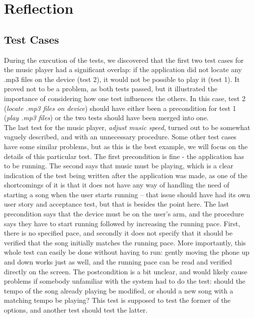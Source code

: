 \section{Reflection}
\subsection{Test Cases}
During the execution of the tests, we discovered that the first two test cases for the music player had a significant overlap: if the application did not locate any .mp3 files on the device (test 2), it would not be possible to play it (test 1).
It proved not to be a problem, as both tests passed, but it illustrated the importance of considering how one test influences the others.
In this case, test 2 (\textit{locate .mp3 files on device}) should have either been a precondition for test 1 (\textit{play .mp3 files}) or the two tests should have been merged into one.\\

The last test for the music player, \textit{adjust music speed}, turned out to be somewhat vaguely described, and with an unnecessary procedure.
Some other test cases have some similar problems, but as this is the best example, we will focus on the details of this particular test.
The first precondition is fine - the application has to be running.
The second says that music must be playing, which is a clear indication of the test being written after the application was made, as one of the shortcomings of it is that it does not have any way of handling the need of starting a song when the user starts running -- that issue should have had its own user story and acceptance test, but that is besides the point here.
The last precondition says that the device must be on the user's arm, and the procedure says they have to start running followed by increasing the running pace.
First, there is no specified pace, and secondly it does not specify that it should be verified that the song initially matches the running pace.
More importantly, this whole test can easily be done without having to run: gently moving the phone up and down works just as well, and the running pace can be read and verified directly on the screen.
The postcondition is a bit unclear, and would likely cause problems if somebody unfamiliar with the system had to do the test: should the tempo of the song already playing be modified, or should a new song with a matching tempo be playing? This test is supposed to test the former of the options, and another test should test the latter.

